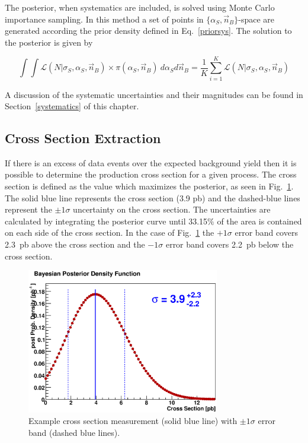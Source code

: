The posterior, when systematics are included, is solved using Monte Carlo importance sampling. In this method a set of points in $\{ \alpha_{S}, \vec{n}_{B} \}$-space are generated according the prior density defined in Eq.~\ref{priorsys}. The solution to the posterior is given by

\begin{equation}
\label{mcint}
\int \int \mathcal{L}(N|\sigma_{S},\alpha_{S}, \vec{n}_{B}) \times \pi(\alpha_{S}, \vec{n}_{B}) ~ d\alpha_{S}d\vec{n}_{B} = \frac{1}{K} \sum_{i=1}^{K} \mathcal{L}(N|\sigma_{S},\alpha_{S}, \vec{n}_{B})
\end{equation}

A discussion of the systematic uncertainties and their magnitudes can be found in Section~\ref{systematics} of this chapter.

\subsection{Cross Section Extraction}

If there is an excess of data events over the expected background yield then it is possible to determine the production cross section for a given process. The cross section is defined as the value which maximizes the posterior, as seen in Fig.~\ref{CrossSection}. The solid blue line represents the cross section (3.9 pb) and the dashed-blue lines represent the $\pm1\sigma$ uncertainty on the cross section. The uncertainties are calculated by integrating the posterior curve until 33.15$\%$ of the area is contained on each side of the cross section. In the case of Fig.~\ref{CrossSection} the $+1\sigma$ error band covers 2.3~pb above the cross section and the $-1\sigma$ error band covers 2.2~pb below the cross section.

\begin{figure}[!h!tbp]
\begin{center}
\includegraphics[width=0.75\textwidth]{eps/Limits/CrossSection.eps}
\end{center}
\vspace{-0.1in}
\caption{Example cross section measurement (solid blue line) with $\pm1\sigma$ error band (dashed blue lines).}
\label{CrossSection}
\end{figure}

